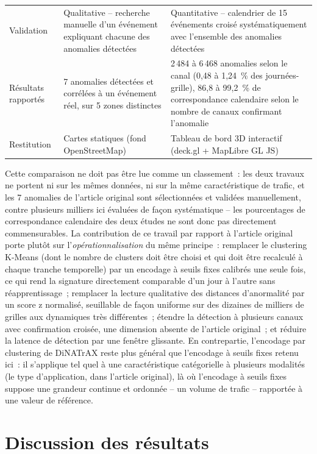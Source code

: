\begin{table}[htbp]
\begin{tabular}{lp{5.4cm}p{5.4cm}}
    Validation &
      Qualitative -- recherche manuelle d'un événement expliquant
      chacune des anomalies détectées &
      Quantitative -- calendrier de 15 événements croisé
      systématiquement avec l'ensemble des anomalies détectées \\
    Résultats rapportés &
      7 anomalies détectées et corrélées à un événement réel, sur 5
      zones distinctes &
      2\,484 à 6\,468 anomalies selon le canal (0,48 à 1,24~\% des
      journées-grille), 86,8 à 99,2~\% de correspondance calendaire
      selon le nombre de canaux confirmant l'anomalie \\
    Restitution &
      Cartes statiques (fond OpenStreetMap) &
      Tableau de bord 3D interactif (deck.gl + MapLibre GL JS) \\
    \bottomrule
  \end{tabular}
\end{table}

Cette comparaison ne doit pas être lue comme un classement~: les deux
travaux ne portent ni sur les mêmes données, ni sur la même
caractéristique de trafic, et les 7 anomalies de l'article original
sont sélectionnées et validées manuellement, contre plusieurs milliers
ici évaluées de façon systématique -- les pourcentages de
correspondance calendaire des deux études ne sont donc pas
directement commensurables. La contribution de ce travail par rapport
à l'article original porte plutôt sur l'\emph{opérationnalisation} du
même principe~: remplacer le clustering K-Means (dont le nombre de
clusters doit être choisi et qui doit être recalculé à chaque tranche
temporelle) par un encodage à seuils fixes calibrés une seule fois,
ce qui rend la signature directement comparable d'un jour à l'autre
sans réapprentissage~; remplacer la lecture qualitative des distances
d'anormalité par un score z normalisé, seuillable de façon uniforme
sur des dizaines de milliers de grilles aux dynamiques très
différentes~; étendre la détection à plusieurs canaux avec
confirmation croisée, une dimension absente de l'article original~;
et réduire la latence de détection par une fenêtre glissante. En
contrepartie, l'encodage par clustering de DiNATrAX reste plus général
que l'encodage à seuils fixes retenu ici~: il s'applique tel quel à
une caractéristique catégorielle à plusieurs modalités (le type
d'application, dans l'article original), là où l'encodage à seuils
fixes suppose une grandeur continue et ordonnée -- un volume de
trafic -- rapportée à une valeur de référence.

\section{Discussion des résultats}

